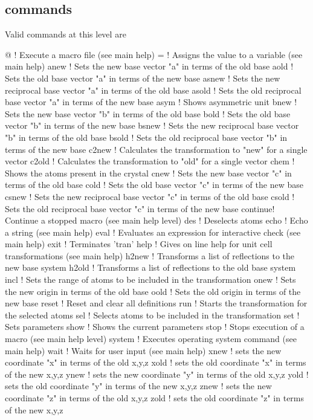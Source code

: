 \subsection*{commands}
Valid commands at this level are 
\par
\begin{MacVerbatim}
@       ! Execute a macro file (see main help)
=       ! Assigns the value to a variable (see main help)
anew    ! Sets the new base vector "a" in terms of the old base
aold    ! Sets the old base vector "a" in terms of the new base
asnew   ! Sets the new reciprocal base vector "a" in terms of the old base
asold   ! Sets the old reciprocal base vector "a" in terms of the new base
asym    ! Shows asymmetric unit
bnew    ! Sets the new base vector "b" in terms of the old base
bold    ! Sets the old base vector "b" in terms of the new base
bsnew   ! Sets the new reciprocal base vector "b" in terms of the old base
bsold   ! Sets the old reciprocal base vector "b" in terms of the new base
c2new   ! Calculates the transformation to "new" for a single vector
c2old   ! Calculates the transformation to "old" for a single vector
chem    ! Shows the atoms present in the crystal
cnew    ! Sets the new base vector "c" in terms of the old base
cold    ! Sets the old base vector "c" in terms of the new base
csnew   ! Sets the new reciprocal base vector "c" in terms of the old base
csold   ! Sets the old reciprocal base vector "c" in terms of the new base
continue! Continue a stopped macro (see main help level)
des     ! Deselects atoms
echo    ! Echo a string (see main help)
eval    ! Evaluates an expression for interactive check (see main help)
exit    ! Terminates 'tran'
help    ! Gives on line help for unit cell transformations (see main help)
h2new   ! Transforms a list of reflections to the new base system
h2old   ! Transforms a list of reflections to the old base system
incl    ! Sets the range of atoms to be included in the transformation
onew    ! Sets the new origin in terms of the old base
oold    ! Sets the old origin in terms of the new base
reset   ! Reset and clear all definitions
run     ! Starts the transformation for the selected atoms
sel     ! Selects atoms to be included in the transformation
set     ! Sets parameters
show    ! Shows the current parameters
stop    ! Stops execution of a macro (see main help level)
system  ! Executes operating system command (see main help)
wait    ! Waits for user input (see main help)
xnew    ! sets the new coordinate "x" in terms of the old x,y,z
xold    ! sets the old coordinate "x" in terms of the new x,y,z
ynew    ! sets the new coordinate "y" in terms of the old x,y,z
yold    ! sets the old coordinate "y" in terms of the new x,y,z
znew    ! sets the new coordinate "z" in terms of the old x,y,z
zold    ! sets the old coordinate "z" in terms of the new x,y,z
\end{MacVerbatim}
